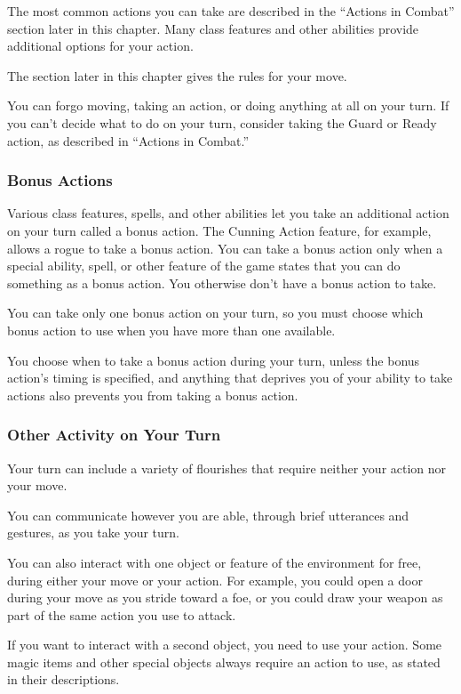 The most common actions you can take are described in the “Actions in Combat” section later in this chapter. Many class features and other abilities provide additional options for your action.

The  section later in this chapter gives the rules for your move.

You can forgo moving, taking an action, or doing anything at all on your turn. If you can't decide what to do on your turn, consider taking the Guard or Ready action, as described in “Actions in Combat.”

\subsubsection{Bonus Actions}

Various class features, spells, and other abilities let you take an additional action on your turn called a bonus action. The Cunning Action feature, for example, allows a rogue to take a bonus action. You can take a bonus action only when a special ability, spell, or other feature of the game states that you can do something as a bonus action. You otherwise don't have a bonus action to take.

You can take only one bonus action on your turn, so you must choose which bonus action to use when you have more than one available.

You choose when to take a bonus action during your turn, unless the bonus action's timing is specified, and anything that deprives you of your ability to take actions also prevents you from taking a bonus action.

\subsubsection{Other Activity on Your Turn}

Your turn can include a variety of flourishes that require neither your action nor your move.

You can communicate however you are able, through brief utterances and gestures, as you take your turn.

You can also interact with one object or feature of the environment for free, during either your move or your action. For example, you could open a door during your move as you stride toward a foe, or you could draw your weapon as part of the same action you use to attack.

If you want to interact with a second object, you need to use your action. Some magic items and other special objects always require an action to use, as stated in their descriptions.

